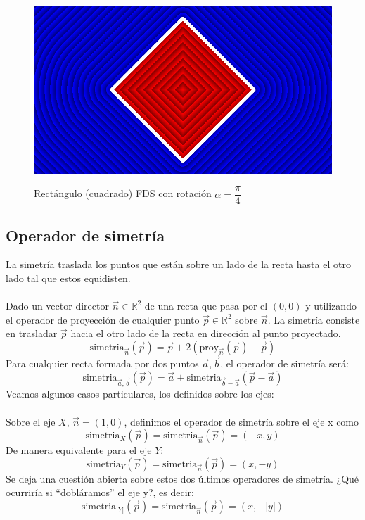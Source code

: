 \begin{figure}[H]
  \centering
  \captionsetup{justification=centering}%
  \includegraphics[width=1.0\textwidth]{secciones/imagenes/sdf/2d/sdf_rotacion.png}\label{fig:rotacion}
  \caption{Rectángulo (cuadrado) FDS con rotación \(\alpha=\dfrac{\pi}{4}\)}
\end{figure}

\subsection{Operador de simetría}
La simetría traslada los puntos que están sobre un lado de la recta hasta el otro lado tal que estos equidisten.\\\\ Dado un vector director \(\Vec{n}\in\mathbb{R}^2\) de una recta que pasa por el \((0,0)\) y utilizando el operador de proyección de cualquier punto \(\Vec{p}\in\mathbb{R}^2\) sobre \(\Vec{n}\). La simetría consiste en trasladar \(\Vec{p}\) hacia el otro lado de la recta en dirección al punto proyectado.
\[\text{simetria}_{\Vec{n}}(\Vec{p})=\Vec{p} + 2(\text{proy}_{\Vec{n}}(\Vec{p})-\Vec{p})\]
Para cualquier recta formada por dos puntos \(\Vec{a}, \Vec{b}\), el operador de simetría será:
\[\text{simetria}_{\Vec{a},\Vec{b}}(\Vec{p}) =\Vec{a}+ \text{simetria}_{\Vec{b}-\Vec{a}}(\Vec{p}-\Vec{a})\]
Veamos algunos casos particulares, los definidos sobre los ejes:\\\\
Sobre el eje \(X\), \(\Vec{n}=(1,0)\), definimos el operador de simetría sobre el eje x como
\[\text{simetria}_{X}(\Vec{p})=\text{simetria}_{\Vec{n}}(\Vec{p})=(-x, y)\]
De manera equivalente para el eje \(Y\):
\[\text{simetria}_{Y}(\Vec{p})=\text{simetria}_{\Vec{n}}(\Vec{p})=(x, -y)\]
Se deja una cuestión abierta sobre estos dos últimos operadores de simetría. ¿Qué ocurriría si \enquote{dobláramos} el eje y?, es decir:
\[\text{simetria}_{\vert Y\vert}(\Vec{p})=\text{simetria}_{\Vec{n}}(\Vec{p})=(x, -\vert y\vert)\]


